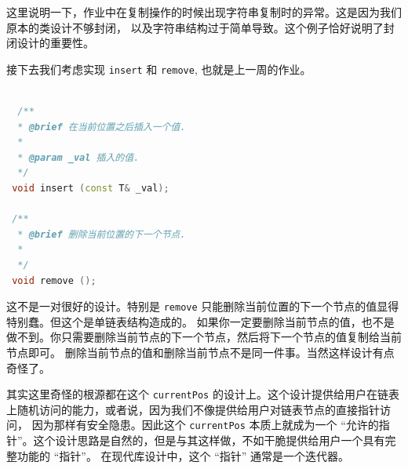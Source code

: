 \documentclass[a4paper]{ctexart}
\theoremstyle{definition}
\theoremstyle{definition}
\begin{document}



这里说明一下，作业中在复制操作的时候出现字符串复制时的异常。这是因为我们原本的类设计不够封闭，
以及字符串结构过于简单导致。这个例子恰好说明了封闭设计的重要性。

接下去我们考虑实现 \verb|insert| 和 \verb|remove|, 也就是上一周的作业。

\begin{lstlisting}[language=C++]

  /**
  * @brief 在当前位置之后插入一个值.
  * 
  * @param _val 插入的值.
  */
 void insert (const T& _val);

 /**
  * @brief 删除当前位置的下一个节点.
  * 
  */
 void remove ();

\end{lstlisting}

这不是一对很好的设计。特别是 \verb|remove| 只能删除当前位置的下一个节点的值显得特别蠢。但这个是单链表结构造成的。
如果你一定要删除当前节点的值，也不是做不到。你只需要删除当前节点的下一个节点，然后将下一个节点的值复制给当前节点即可。
删除当前节点的值和删除当前节点不是同一件事。当然这样设计有点奇怪了。

其实这里奇怪的根源都在这个 \verb|currentPos| 的设计上。这个设计提供给用户在链表上随机访问的能力，或者说，因为我们不像提供给用户对链表节点的直接指针访问，
因为那样有安全隐患。因此这个 \verb|currentPos| 本质上就成为一个 ``允许的指针''。这个设计思路是自然的，但是与其这样做，不如干脆提供给用户一个具有完整功能的 ``指针''。
在现代库设计中，这个 ``指针'' 通常是一个迭代器。
\end{document}

